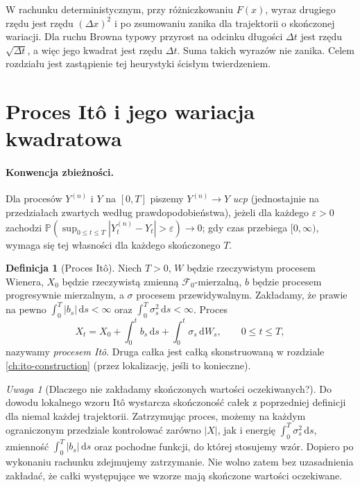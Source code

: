 \documentclass[11pt,a4paper,oneside]{report}
\numberwithin{equation}{chapter}
\theoremstyle{plain}
\theoremstyle{definition}
\newtheorem{definicja}{Definicja}[chapter]
\theoremstyle{remark}
\newtheorem{uwaga}{Uwaga}[chapter]
\newcommand{\Prob}{\mathbb{P}}
\newcommand{\calF}{\mathcal{F}}
\newcommand{\dd}{\mathrm{d}}
\begin{document}
W rachunku deterministycznym, przy różniczkowaniu $F(x)$,
wyraz drugiego rzędu jest rzędu $(\Delta x)^2$ i po
zsumowaniu zanika dla trajektorii o skończonej wariacji.
Dla ruchu Browna typowy przyrost na odcinku długości
$\Delta t$ jest rzędu $\sqrt{\Delta t}$, a więc jego
kwadrat jest rzędu $\Delta t$. Suma takich wyrazów nie
zanika. Celem rozdziału jest zastąpienie tej heurystyki
ścisłym twierdzeniem.

\section{Proces Itô i jego wariacja kwadratowa}\label{sec:volIII:03:02}
\paragraph{Konwencja zbieżności.}
Dla procesów $Y^{(n)}$ i $Y$ na $[0,T]$ piszemy
$Y^{(n)}\to Y$ \emph{ucp} (jednostajnie na przedziałach
zwartych według prawdopodobieństwa), jeżeli dla każdego
$\varepsilon>0$ zachodzi
$\Prob(\sup_{0\le t\le T}|Y_t^{(n)}-Y_t|>\varepsilon)
\to0$; gdy czas przebiega $[0,\infty)$, wymaga się
tej własności dla każdego skończonego $T$.

\begin{definicja}[Proces Itô]\label{def:volIII:03:01}
Niech $T>0$, $W$ będzie rzeczywistym procesem Wienera,
$X_0$ będzie rzeczywistą zmienną $\calF_0$-mierzalną,
$b$ będzie procesem progresywnie mierzalnym, a $\sigma$
procesem przewidywalnym. Zakładamy, że prawie na pewno
$\int_0^T|b_s|\,\dd s<\infty$ oraz
$\int_0^T\sigma_s^2\,\dd s<\infty$.
Proces
\[
X_t=X_0+\int_0^tb_s\,\dd s+\int_0^t\sigma_s\,\dd W_s,
\qquad 0\le t\le T,
\tag{3.1}\label{eq:ito-process}
\]
nazywamy \emph{procesem Itô}. Druga całka jest całką
skonstruowaną w rozdziale \ref{ch:ito-construction}
(przez lokalizację, jeśli to konieczne).
\end{definicja}

\begin{uwaga}[Dlaczego nie zakładamy skończonych wartości oczekiwanych?]
Do dowodu lokalnego wzoru Itô wystarcza skończoność całek
z poprzedniej definicji dla niemal każdej trajektorii.
Zatrzymując proces, możemy na każdym ograniczonym przedziale
kontrolować zarówno $|X|$, jak i energię $\int_0^T\sigma_s^2\,\dd s$,
zmienność $\int_0^T|b_s|\,\dd s$ oraz pochodne funkcji, do której
stosujemy wzór. Dopiero po wykonaniu rachunku zdejmujemy
zatrzymanie. Nie wolno zatem bez uzasadnienia zakładać, że
całki występujące we wzorze mają skończone wartości oczekiwane.
\end{uwaga}
\end{document}
